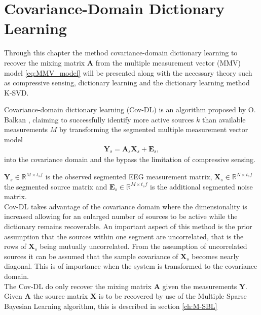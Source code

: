 \chapter{Covariance-Domain Dictionary Learning}\label{ch:Cov-DL}
Through this chapter the method covariance-domain dictionary learning to recover the mixing matrix $\mathbf{A}$ from the multiple measurement vector (MMV) model \eqref{eq:MMV_model} will be presented along with the necessary theory such as compressive sensing, dictionary learning and the dictionary learning method K-SVD. 

Covariance-domain dictionary learning (Cov-DL) is an algorithm proposed by O. Balkan \cite{Balkan2015}, claiming to successfully identify more active sources $k$ than available measurements $M$ by transforming the segmented multiple measurement vector model 
\begin{align*}
\mathbf{Y}_s = \mathbf{A}_s \mathbf{X}_s + \textbf{E}_s,
\end{align*}
into the covariance domain and the bypass the limitation of compressive sensing.



$\mathbf{Y}_s \in \mathbb{R}^{M \times t_s f}$ is the observed segmented EEG measurement matrix, $\mathbf{X}_s \in \mathbb{R}^{N \times t_s f}$ the segmented source matrix and $\mathbf{E}_s \in \mathbb{R}^{M \times t_s f}$ is the additional segmented noise matrix.
\\
Cov-DL takes advantage of the covariance domain where the dimensionality is increased allowing for an enlarged number of sources to be active while the dictionary remains recoverable.  
An important aspect of this method is the prior assumption that the sources within one segment are uncorrelated, that is the rows of $\textbf{X}_s$ being mutually uncorrelated. 
From the assumption of uncorrelated sources it can be assumed that the sample covariance of $\textbf{X}_s$ becomes nearly diagonal. 
This is of importance when the system is transformed to the covariance domain.    
\\
The Cov-DL do only recover the mixing matrix $\mathbf{A}$ given the measurements $\textbf{Y}$. Given $\textbf{A}$ the source matrix $\mathbf{X}$ is to be recovered by use of the Multiple Sparse Bayesian Learning algorithm, this is described in section \ref{ch:M-SBL} 



